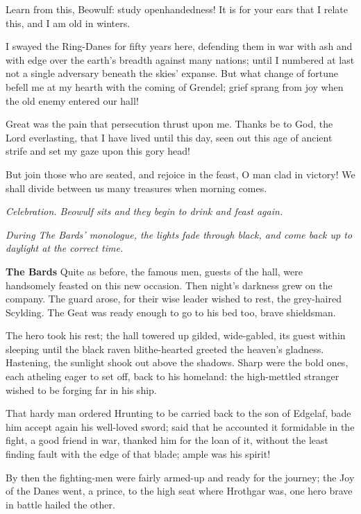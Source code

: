 \documentclass[a4paper]{article}
\begin{document}
{Learn from this, Beowulf:
study openhandedness! It is for your ears that I relate this,
and I am old in winters.

I swayed the Ring-Danes
for fifty years here, defending them in war
with ash and with edge over the earth's breadth
against many nations; until I numbered at last
not a single adversary beneath the skies' expanse.
But what change of fortune befell me at my hearth
with the coming of Grendel; grief sprang from joy
when the old enemy entered our hall!

Great was the pain that persecution
thrust upon me. Thanks be to God,
the Lord everlasting, that I have lived until this day,
seen out this age of ancient strife
and set my gaze upon this gory head!

But join those who are seated, and rejoice in the feast,
O man clad in victory! We shall divide between us
many treasures when morning comes.

\centerline{\textit{Celebration. Beowulf sits and they begin to drink and feast again.}}

\newpage
\centerline{\textit{During The Bards' monologue, the lights fade through black, and come back up to daylight at the correct time.}}

\textbf{The Bards} Quite as before, the famous men,
guests of the hall, were handsomely feasted
on this new occasion. Then night's darkness
grew on the company. The guard arose,
for their wise leader wished to rest,
the grey-haired Scylding. The Geat was ready enough
to go to his bed too, brave shieldsman.

The hero took his rest; the hall towered up
gilded, wide-gabled, its guest within sleeping
until the black raven blithe-hearted greeted
the heaven's gladness. Hastening, the sunlight
shook out above the shadows. Sharp were the bold ones,
each atheling eager to set off,
back to his homeland: the high-mettled stranger
wished to be forging far in his ship.

That hardy man ordered Hrunting to be carried
back to the son of Edgelaf, bade him accept again
his well-loved sword; said that he accounted it
formidable in the fight, a good friend in war,
thanked him for the loan of it, without the least finding fault
with the edge of that blade; ample was his spirit!

By then the fighting-men were fairly armed-up
and ready for the journey; the Joy of the Danes went,
a prince, to the high seat where Hrothgar was,
one hero brave in battle hailed the other.

}
\end{document}

